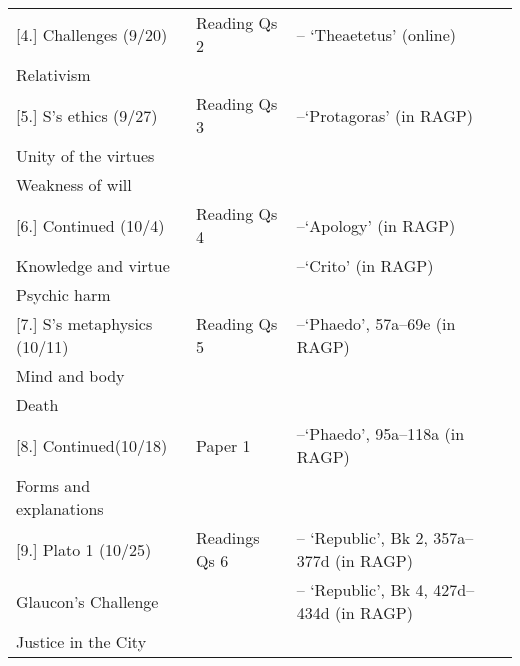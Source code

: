 \documentclass[article,oneside]{memoir}
\begin{document}
\begin{landscape}
\begin{center}
\begin{longtable}{p{8cm}p{4cm}p{8cm}}
[4.] Challenges (9/20)			& Reading Qs 2		&  -- `Theaetetus' (online) \\
Relativism			    	    		& 					&  	 \\ [1.8\baselineskip]  \hline 

[5.] S's ethics (9/27)			 	& Reading Qs 3		&  --`Protagoras' (in RAGP) \\
Unity of the virtues				&					& \\
Weakness of will			      	& 					&   \\ [1.8\baselineskip]  \hline 

[6.] Continued (10/4)				& Reading Qs 4		&  --`Apology' (in RAGP) \\
Knowledge and virtue			& 					&  --`Crito' (in RAGP) \\
Psychic harm					& 					&	 \\ [1.8\baselineskip]  \hline 


[7.] S's metaphysics (10/11)		& Reading Qs 5				& --`Phaedo', 57a--69e (in RAGP)	 \\
Mind and body			     		& 					& \\
Death		                                  & 					&  \\ [1.8\baselineskip]  \hline


[8.] Continued(10/18)		 	& Paper 1	    	 &  --`Phaedo', 95a--118a  (in RAGP) \\  %
Forms and explanations			& 				    	 &  \\ [1.8\baselineskip]  \hline %
 
  
							

[9.] Plato 1 (10/25)				& Readings Qs	6		& -- `Republic', Bk 2, 357a--377d (in RAGP)  \\ 
Glaucon's Challenge				& 	 				& -- `Republic', Bk 4, 427d--434d (in RAGP) \\ 
Justice in the City 				&					&    	\\ [1.8\baselineskip] \hline		 


\end{longtable}
\end{center}
\end{landscape}
\end{document}
